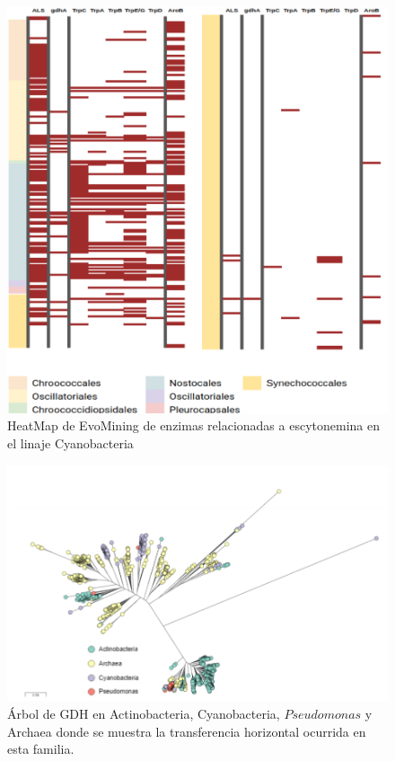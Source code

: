 \documentclass[12pt,twoside]{reedthesis}
\begin{document}
  \begin{figure}[h!tbp]
  \centering
  \includegraphics[angle = 0,scale = .8]{Anexos/HeatMapsytonemin.pdf}
  \caption[HeatMap de EvoMining de enzimas relacionadas a escytonemina en el linaje Cyanobacteria]{\footnotesize{HeatMap de EvoMining de enzimas relacionadas a escytonemina en el linaje Cyanobacteria}}
  \label{fig:HeatMapsytonemin}
  \end{figure}
  
  \begin{figure}[h!tbp]
  \centering
  \includegraphics[angle = 0,scale = .8]{Anexos/GDHJunto.png}
  \caption[Árbol de GDH en Actinobacteria, Cyanobacteria, $Pseudomonas$ y Archaea donde se muestra la transferencia horizontal ocurrida en esta familia.]{\footnotesize{Árbol de GDH en Actinobacteria, Cyanobacteria, $Pseudomonas$ y Archaea donde se muestra la transferencia horizontal ocurrida en esta familia.}}
  \label{fig:GDHJunto}
  \end{figure}
  
\end{document}
